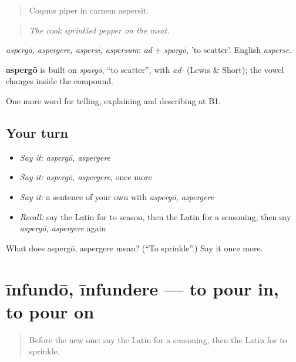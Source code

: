 \begin{quote}
Coquus piper in carnem aspersit.
\end{quote}

\begin{quote}
\emph{The cook sprinkled pepper on the meat.}
\end{quote}

\emph{aspergō, aspergere, aspersī, aspersum}: \emph{ad} + \emph{spargō}, 'to scatter'. English \emph{asperse}.

\begin{cousinweb}
\textbf{aspergō} is built on \emph{spargō}, \textquotedblleft{}to scatter\textquotedblright{}, with \emph{ad-} (Lewis \& Short); the vowel changes inside the compound.
\end{cousinweb}

\begin{grammarlens}[title={What you've built}]
One more word for telling, explaining and describing at B1.
\end{grammarlens}

\subsection*{Your turn}
\begin{itemize}
\raggedright
  \item \emph{Say it:} \emph{aspergō, aspergere}
  \item \emph{Say it:} \emph{aspergō, aspergere}, once more
  \item \emph{Say it:} a sentence of your own with \emph{aspergō, aspergere}
  \item \emph{Recall:} say the Latin for to season, then the Latin for a seasoning, then say \emph{aspergō, aspergere} again
\end{itemize}

\begin{tcolorbox}[breakable,colback=teal!4,colframe=teal!35!black,title={Before you move on}]
What does aspergō, aspergere mean? (\textquotedblleft{}To sprinkle\textquotedblright{}.) Say it once more.
\end{tcolorbox}
\section[īnfundō, īnfundere]{īnfundō, īnfundere — to pour in, to pour on}

\label{lesson:LA-C355-infundo}



\begin{quote}
Before the new one: say the Latin for a seasoning, then the Latin for to sprinkle.
\end{quote}

